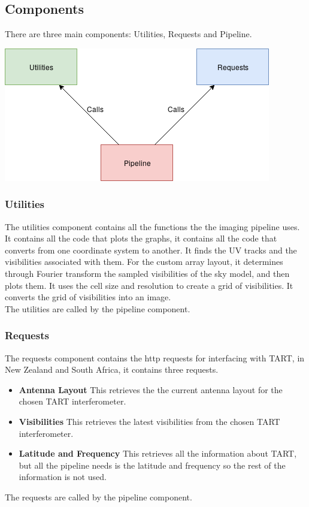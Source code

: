 \subsection{Components}
There are three main components: Utilities, Requests and Pipeline.
\begin{center}
    \includegraphics[scale=0.6]{images/BlockDiagram.png}
\end{center}{}
\subsubsection{Utilities}
The utilities component contains all the functions the the imaging pipeline uses.\\
It contains all the code that plots the graphs, it contains all the code that converts from one coordinate system to another. It finds the UV tracks and the visibilities associated with them. For the custom array layout, it determines through Fourier transform the sampled visibilities of the sky model, and then plots them. It uses the cell size and resolution to create a grid of visibilities. It converts the grid of visibilities into an image.\\
The utilities are called by the pipeline component.

\subsubsection{Requests}
The requests component contains the http requests for interfacing with TART, in New Zealand and South Africa, it contains three requests.
\begin{itemize}
    \item \textbf{Antenna Layout} This retrieves the the current antenna layout for the chosen TART interferometer.
    \item \textbf{Visibilities} This retrieves the latest visibilities from the chosen TART interferometer.
    \item \textbf{Latitude and Frequency} This retrieves all the information about TART, but all the pipeline needs is the latitude and frequency so the rest of the information is not used.
\end{itemize}
The requests are called by the pipeline component.

